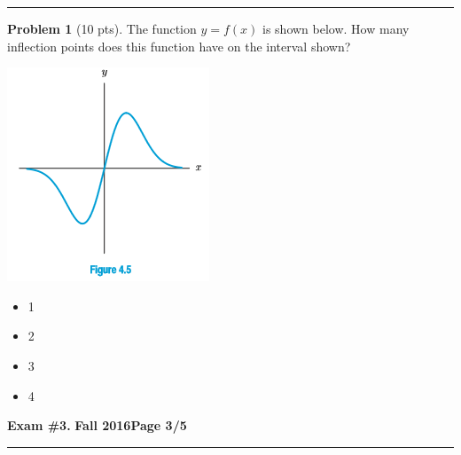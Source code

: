 \documentclass[12pt]{article}
\makeatletter
\theoremstyle{definition}
\newtheorem{problem}{Problem}
\newcommand*{\radiobutton}{%
  \@ifstar{\@radiobutton0}{\@radiobutton1}%
}
\newcommand*{\@radiobutton}[1]{%
  \begin{tikzpicture}
    \pgfmathsetlengthmacro\radius{height("X")/2}
    \draw[radius=\radius] circle;
    \ifcase#1 \fill[radius=.6*\radius] circle;\fi
  \end{tikzpicture}%
}
\makeatother
\begin{document}
\vspace{3cm}
\hrule
\begin{problem}[10 pts]
The function $y=f(x)$ is shown below.  How many inflection points does this function have on the interval shown?
\begin{center}
\includegraphics{3graph1.png}
\end{center}
\begin{itemize}
\item[\radiobutton] 1
\item[\radiobutton] 2
\item[\radiobutton] 3
\item[\radiobutton] 4
\end{itemize}
\end{problem}
\newpage

\hfill{\large\bf Exam \#3.}\hfill{\large\bf
  Fall 2016}\hfill{\large\bf Page 3/5}\hrule
\end{document}
